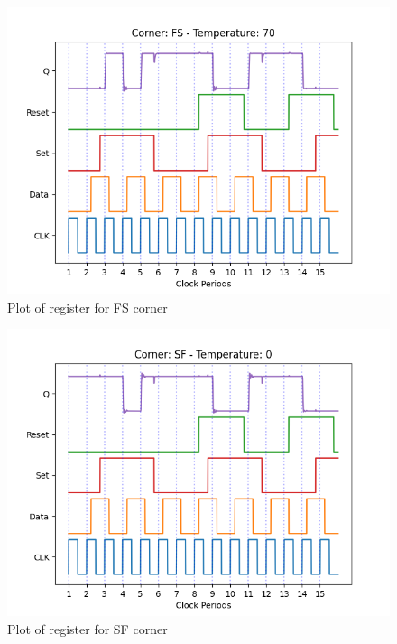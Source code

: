 \begin{figure}[H]
    \centering
    \includegraphics[width=\textwidth]{Figures/Aimspice_Plots/FS_70.png}
    \caption{Plot of register for FS corner}
    \label{fig:FS70}
\end{figure}

\begin{figure}[H]
    \centering
    \includegraphics[width=\textwidth]{Figures/Aimspice_Plots/SF_0.png}
    \caption{Plot of register for SF corner}
    \label{fig:SF0}
\end{figure}

